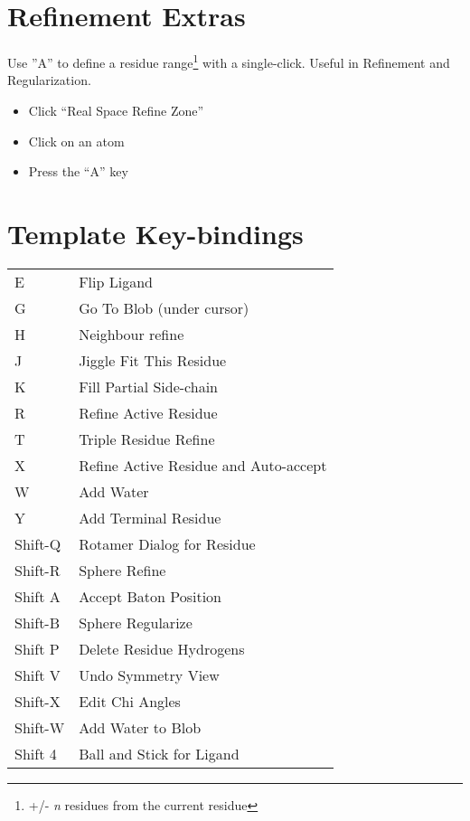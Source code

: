 \documentclass[twocolumn]{article}
\begin{document}
\section{Refinement Extras}
Use ''A'' to define a residue range\footnote{+/- \emph{n} residues
  from the current residue} with a single-click. Useful in Refinement
and Regularization.

\begin{itemize}
\item Click ``Real Space Refine Zone''
\item Click on an atom
\item Press the ``A'' key
\end{itemize}

\section{Template Key-bindings}

\begin{tabular}{ll}

  E & Flip Ligand \\
  G & Go To Blob (under cursor) \\
  H & Neighbour refine \\
  J & Jiggle Fit This Residue \\
  K & Fill Partial Side-chain \\
  R & Refine Active Residue \\
  T & Triple Residue Refine \\
  X & Refine Active Residue and Auto-accept \\
  W & Add Water \\
  Y & Add Terminal Residue \\
  Shift-Q & Rotamer Dialog for Residue \\
  Shift-R & Sphere Refine \\
  Shift A & Accept Baton Position \\
  Shift-B & Sphere Regularize \\
  Shift P & Delete Residue Hydrogens \\
  Shift V & Undo Symmetry View \\
  Shift-X & Edit Chi Angles \\
  Shift-W & Add Water to Blob \\
  Shift 4 & Ball and Stick for Ligand
\end{tabular}
\end{document}
